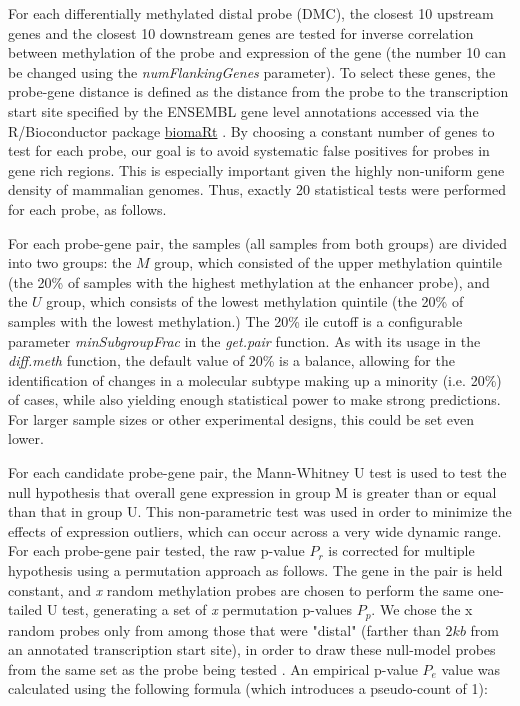 For each differentially methylated distal probe (DMC), the closest 10 upstream 
genes and the closest 10 downstream genes are tested for inverse correlation between 
methylation of the probe and expression of the gene (the number 10 can be changed using the \textit{numFlankingGenes} parameter). To select these genes, 
the probe-gene distance is defined as the distance from the probe to the transcription 
start site specified by the ENSEMBL gene level annotations \cite{yates2015ensembl} accessed via
the R/Bioconductor package \href{http://bioconductor.org/packages/biomaRt/}{biomaRt} \cite{durinck2009mapping,durinck2005biomart}. By choosing a constant number of genes to test for each probe, our goal is to avoid systematic false positives for probes in gene rich regions. This is especially important given the highly non-uniform gene density of mammalian genomes.
Thus, exactly 20 statistical tests were performed for each probe, as follows. 

For each probe-gene pair, the samples (all samples from both groups) are divided into two 
groups: the $M$ group, which consisted of the upper methylation quintile (the 20\%
of samples with the highest methylation at the enhancer probe), and the $U$ group, 
which consists of the lowest methylation quintile (the 20\% of samples with the 
lowest methylation.) The 20\% ile cutoff is a configurable parameter \textit{minSubgroupFrac} in the \textit{get.pair} function.
As with its usage in the \textit{diff.meth} function, the default value of 20\% is a balance, allowing for the identification of changes in a 
molecular subtype making up a minority (i.e. 20\%) of cases, while also yielding 
enough statistical power to make strong predictions. For larger sample sizes or other experimental designs, this could be set even lower.

For each candidate probe-gene pair, 
the Mann-Whitney U test is used to test the null hypothesis that overall gene 
expression in group M is greater than or equal than that in group U. 
This non-parametric test was used in order to minimize the effects 
of expression outliers, which can  occur across a very wide dynamic range. 
For each probe-gene pair tested, the raw p-value $P_r$ is corrected for multiple 
hypothesis using a permutation approach as follows.
The gene in the pair is held constant, and \textit{x} random methylation probes are 
chosen to perform the same one-tailed U test, generating a set of \textit{x} permutation
p-values $P_p$. We chose the x random probes only from among those that were 
"distal" (farther than $2kb$ from an annotated transcription start site), in order 
to draw these null-model probes from the same set as the probe being tested \cite{sham2014statistical}. 
An empirical p-value $P_e$ value was calculated using the following formula 
(which introduces a pseudo-count of 1):

